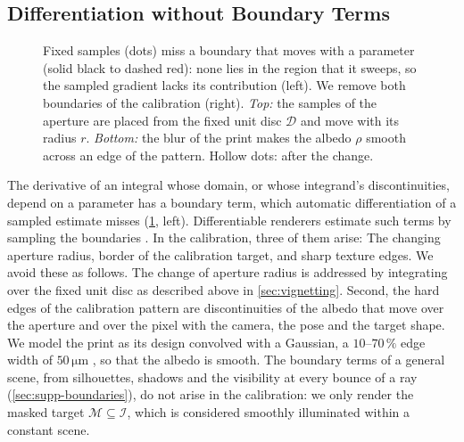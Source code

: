 \subsection{Differentiation without Boundary Terms}
\label{sec:boundary-terms}
\begin{figure}[t]
        \centering
        
        \caption{Fixed samples (dots) miss a boundary that moves with a parameter (solid black to dashed red): none lies in the region that it sweeps, so the sampled gradient lacks its contribution (left). We remove both boundaries of the calibration (right). \emph{Top:} the samples of the aperture are placed from the fixed unit disc $\mathcal{D}$ and move with its radius $r$. \emph{Bottom:} the blur of the print makes the albedo $\rho$ smooth across an edge of the pattern. Hollow dots: after the change.}
        \label{fig:boundary}
\end{figure}
The derivative of an integral whose domain, or whose integrand's
discontinuities, depend on a parameter has a boundary term, which
automatic differentiation of a sampled estimate misses
(\cref{fig:boundary}, left). Differentiable renderers estimate such
terms by sampling the boundaries
\cite{Li:2018:DMC, Zhang:2020:PSDR, mitsuba-projective}. In the
calibration, three of them arise: The changing aperture radius, border of the calibration target, and sharp texture edges. We avoid these as follows.
The change of aperture radius is addressed by integrating over the fixed unit disc as described above in \cref{sec:vignetting}. 
Second, the hard edges of the calibration pattern are discontinuities of the albedo that
move over the aperture and over the pixel with the camera, the pose
and the target shape. We model the print as its design convolved
with a Gaussian, a $10$--$70\,\%$ edge width of $50\,\mathrm{\mu m}$
\cite{rosalen2019cardboards}, so that the albedo is smooth. The
boundary terms of a general scene, from silhouettes, shadows and
the visibility at every bounce of a ray
(\cref{sec:supp-boundaries}), do not arise in the calibration: we only 
render the masked target $\mathcal{M}\subseteq\mathcal{I}$, which is considered smoothly illuminated within a constant scene.

